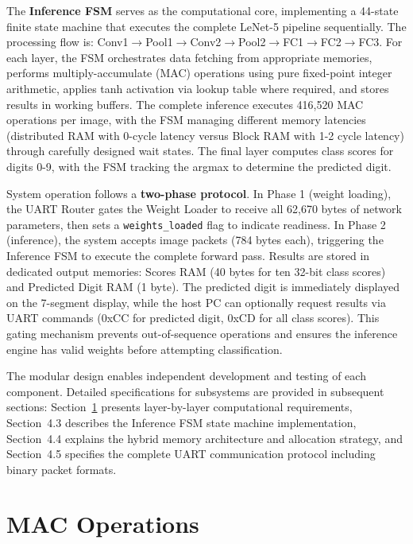\documentclass[12pt,a4paper]{report}
\begin{document}
The \textbf{Inference FSM} serves as the computational core, implementing a 44-state finite state machine that executes the complete LeNet-5 pipeline sequentially. The processing flow is: Conv1$\rightarrow$Pool1$\rightarrow$Conv2$\rightarrow$Pool2$\rightarrow$FC1$\rightarrow$FC2$\rightarrow$FC3. For each layer, the FSM orchestrates data fetching from appropriate memories, performs multiply-accumulate (MAC) operations using pure fixed-point integer arithmetic, applies tanh activation via lookup table where required, and stores results in working buffers. The complete inference executes 416,520 MAC operations per image, with the FSM managing different memory latencies (distributed RAM with 0-cycle latency versus Block RAM with 1-2 cycle latency) through carefully designed wait states. The final layer computes class scores for digits 0-9, with the FSM tracking the argmax to determine the predicted digit.

System operation follows a \textbf{two-phase protocol}. In Phase 1 (weight loading), the UART Router gates the Weight Loader to receive all 62,670 bytes of network parameters, then sets a \texttt{weights\_loaded} flag to indicate readiness. In Phase 2 (inference), the system accepts image packets (784 bytes each), triggering the Inference FSM to execute the complete forward pass. Results are stored in dedicated output memories: Scores RAM (40 bytes for ten 32-bit class scores) and Predicted Digit RAM (1 byte). The predicted digit is immediately displayed on the 7-segment display, while the host PC can optionally request results via UART commands (0xCC for predicted digit, 0xCD for all class scores). This gating mechanism prevents out-of-sequence operations and ensures the inference engine has valid weights before attempting classification.

The modular design enables independent development and testing of each component. Detailed specifications for subsystems are provided in subsequent sections: Section~\ref{sec:lenet_mac_ops} presents layer-by-layer computational requirements, Section~4.3 describes the Inference FSM state machine implementation, Section~4.4 explains the hybrid memory architecture and allocation strategy, and Section~4.5 specifies the complete UART communication protocol including binary packet formats.

\section{MAC Operations}
\label{sec:lenet_mac_ops}
\end{document}
